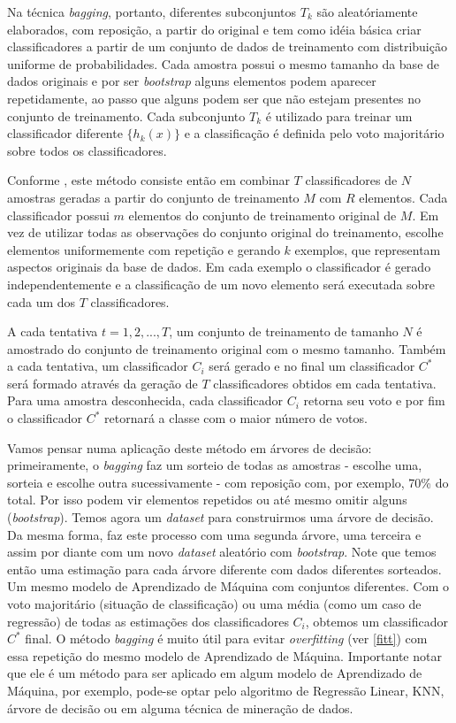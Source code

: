 \documentclass[
  openany]{book}
\begin{document}
Na técnica \emph{bagging}, portanto, diferentes subconjuntos \(T_k\) são aleatóriamente elaborados, com reposição, a partir do original e tem como idéia básica criar classificadores a partir de um conjunto de dados de treinamento com distribuição uniforme de probabilidades. Cada amostra possui o mesmo tamanho da base de dados originais e por ser \emph{bootstrap} alguns elementos podem aparecer repetidamente, ao passo que alguns podem ser que não estejam presentes no conjunto de treinamento. Cada subconjunto \(T_k\) é utilizado para treinar um classificador diferente \(\{h_k(x)\}\) e a classificação é definida pelo voto majoritário sobre todos os classificadores.

Conforme \citep{oshiro2013abordagem}, este método consiste então em combinar \(T\) classificadores de \(N\) amostras geradas a partir do conjunto de treinamento \(M\) com \(R\) elementos. Cada classificador possui \(m\) elementos do conjunto de treinamento original de \(M\). Em vez de utilizar todas as observações do conjunto original do treinamento, escolhe elementos uniformemente com repetição e gerando \(k\) exemplos, que representam aspectos originais da base de dados. Em cada exemplo o classificador é gerado independentemente e a classificação de um novo elemento será executada sobre cada um dos \(T\) classificadores.

A cada tentativa \(t=1,2,...,T\), um conjunto de treinamento de tamanho \(N\) é amostrado do conjunto de treinamento original com o mesmo tamanho. Também a cada tentativa, um classificador \(C_i\) será gerado e no final um classificador \(C^*\) será formado através da geração de \(T\) classificadores obtidos em cada tentativa. Para uma amostra desconhecida, cada classificador \(C_i\) retorna seu voto e por fim o classificador \(C^*\) retornará a classe com o maior número de votos.

Vamos pensar numa aplicação deste método em árvores de decisão: primeiramente, o \emph{bagging} faz um sorteio de todas as amostras - escolhe uma, sorteia e escolhe outra sucessivamente - com reposição com, por exemplo, 70\% do total. Por isso podem vir elementos repetidos ou até mesmo omitir alguns (\emph{bootstrap}). Temos agora um \emph{dataset} para construirmos uma árvore de decisão. Da mesma forma, faz este processo com uma segunda árvore, uma terceira e assim por diante com um novo \emph{dataset} aleatório com \emph{bootstrap}. Note que temos então uma estimação para cada árvore diferente com dados diferentes sorteados. Um mesmo modelo de Aprendizado de Máquina com conjuntos diferentes. Com o voto majoritário (situação de classificação) ou uma média (como um caso de regressão) de todas as estimações dos classificadores \(C_i\), obtemos um classificador \(C^*\) final. O método \emph{bagging} é muito útil para evitar \emph{overfitting} (ver \ref{fitt}) com essa repetição do mesmo modelo de Aprendizado de Máquina. Importante notar que ele é um método para ser aplicado em algum modelo de Aprendizado de Máquina, por exemplo, pode-se optar pelo algoritmo de Regressão Linear, KNN, árvore de decisão ou em alguma técnica de mineração de dados.
\end{document}
